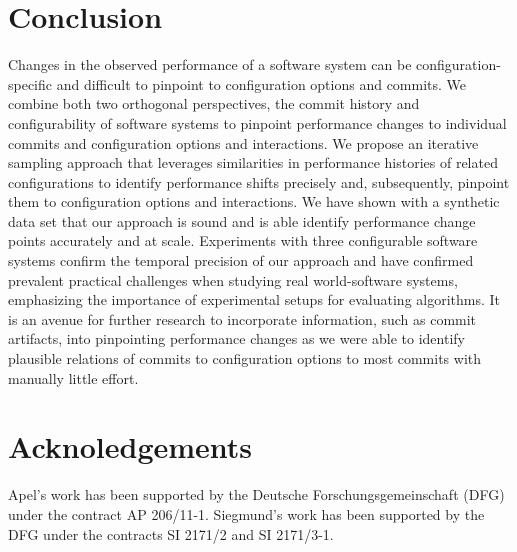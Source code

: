 \documentclass[sigconf]{acmart}
\begin{document}
	\section{Conclusion}
	Changes in the observed performance of a software system can be configuration-specific and difficult to pinpoint to configuration options and commits. We combine both two orthogonal perspectives, the commit history and configurability of software systems to pinpoint performance changes to individual commits and configuration options and interactions. 
	We propose an iterative sampling approach that leverages similarities in performance histories of related configurations to identify performance shifts precisely and, subsequently, pinpoint them to configuration options and interactions. 
	We have shown with a synthetic data set that our approach is sound and is able identify performance change points accurately and at scale. Experiments with three configurable software systems confirm the temporal precision of our approach and have confirmed prevalent practical challenges when studying real world-software systems, emphasizing the importance of experimental setups for evaluating algorithms. It is an avenue for further research to incorporate information, such as commit artifacts, into pinpointing performance changes as we were able to identify plausible relations of commits to configuration options to most commits with manually little effort.
	
	\section{Acknoledgements}
	Apel’s work has been supported by the Deutsche Forschungsgemeinschaft (DFG) under the contract AP 206/11-1. Siegmund’s work has been supported by the DFG under the
    contracts SI 2171/2 and SI 2171/3-1.
	
	\clearpage

	
	
	\clearpage
\end{document}
